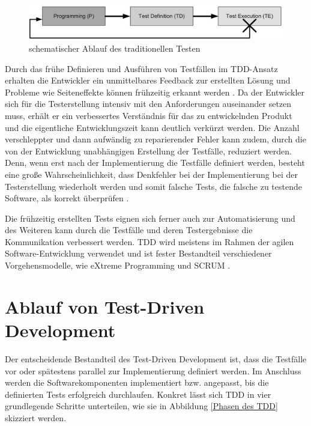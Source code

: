 \begin{figure}[h]
	\centering
	\includegraphics[clip,width=1\linewidth]{images/schematischer Ablauf traditionelles Testen.jpg}
	\caption[schematischer Ablauf des traditionellen Testen]{schematischer Ablauf des traditionellen Testen \cite[S.151]{schatten_best_2010}}
	\label{schematischer Ablauf traditionelles Testen}
\end{figure}

Durch das frühe Definieren und Ausführen von Testfällen im TDD-Ansatz erhalten die Entwickler ein unmittelbares Feedback zur erstellten Lösung und Probleme wie Seiteneffekte können frühzeitig erkannt werden \cite[S. 151]{schatten_best_2010}. 
Da der Entwickler sich für die Testerstellung intensiv mit den Anforderungen auseinander setzen muss, erhält er ein verbessertes Verständnis für das zu entwickelnden Produkt und die eigentliche Entwicklungszeit kann deutlich verkürzt werden. Die Anzahl verschleppter und dann aufwändig zu reparierender Fehler kann zudem, durch die von der Entwicklung unabhängigen Erstellung der Testfälle, reduziert werden. Denn, wenn erst nach der Implementierung die Testfälle definiert werden, besteht eine große Wahrscheinlichkeit, dass Denkfehler bei der Implementierung bei der Testerstellung wiederholt werden und somit falsche Tests, die falsche zu testende Software, als korrekt überprüfen \cite[S.188] {kleuker_qualitatssicherung_2019}.  

Die frühzeitig erstellten Tests eignen sich ferner auch zur Automatisierung und des Weiteren kann durch die Testfälle und deren Testergebnisse die Kommunikation verbessert werden. TDD wird meistens im Rahmen der agilen Software-Entwicklung verwendet und ist fester Bestandteil verschiedener Vorgehensmodelle, wie eXtreme Programming und SCRUM \cite[S. 151]{schatten_best_2010}. 

\section{Ablauf von Test-Driven Development}

Der entscheidende Bestandteil des Test-Driven Development ist, dass die Testfälle vor oder spätestens parallel zur Implementierung definiert werden. Im Anschluss werden die Softwarekomponenten implementiert bzw. angepasst, bis die definierten Tests erfolgreich durchlaufen. Konkret lässt sich TDD in vier grundlegende Schritte unterteilen, wie sie in Abbildung \ref{Phasen des TDD} skizziert werden. \cite[S. 153]{schatten_best_2010}

